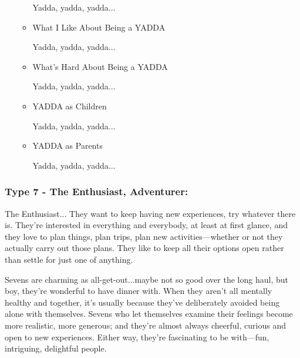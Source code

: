\documentclass[openleft,oneside,showtrims]{memoir}
\begin{document}
\begin{itemize}
\begin{itemize}
Yadda, yadda, yadda...

\item What I Like About Being a YADDA
\label{sec:org292c55c}

Yadda, yadda, yadda...

\item What's Hard About Being a YADDA
\label{sec:org90547be}

Yadda, yadda, yadda...

\item YADDA as Children
\label{sec:orgf74251e}

Yadda, yadda, yadda...

\item YADDA as Parents
\label{sec:orgc5d65b2}

Yadda, yadda, yadda...
\end{itemize}
\end{itemize}

\subsubsection*{Type 7 - The Enthusiast, Adventurer:}
\label{sec:org8da37d8}

The Enthusiast... They want to keep having new experiences, try whatever there is. They're interested in everything and everybody, at least at first glance, and they love to plan things, plan trips, plan new activities—whether or not they actually carry out those plans. They like to keep all their options open rather than settle for just one of anything.

Sevens are charming as all-get-out...maybe not so good over the long haul, but boy, they're wonderful to have dinner with. When they aren't all mentally healthy and together, it's usually because they've deliberately avoided being alone with themselves. Sevens who let themselves examine their feelings become more realistic, more generous; and they're almost always cheerful, curious and open to new experiences. Either way, they're fascinating to be with—fun, intriguing, delightful people.
\end{document}
